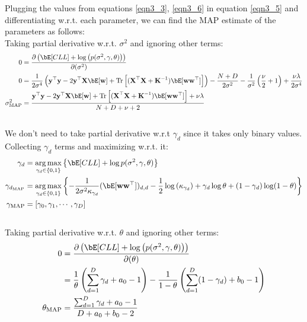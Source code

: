 \documentclass[a4paper,11pt]{article}
\begin{document}
\begin{pmisolution}
\noindent Plugging the values from equations \ref{eqn3_3}, \ref{eqn3_6} in equation \ref{eqn3_5} and differentiating w.r.t. each parameter, we can find the MAP estimate of the parameters as follows:
\\ Taking partial derivative w.r.t. $\sigma^2$ and ignoring other terms:
\begin{align}
    0 &= \frac{\partial \left( \bE[CLL] + \log \left(p(\sigma^2, \gamma, \theta)\right) \right)}{\partial (\sigma^2)} 
    \nonumber
    \\0 &=\frac{1}{2\sigma^4}\left(\textbf{y}^\top\textbf{y} - 2\textbf{y}^\top\textbf{X}\bE[\textbf{w}]+ \text{Tr}\left[(\textbf{X}^\top\textbf{X} +\textbf{K}^{-1})\bE[\textbf{ww}^\top]\right]\right)- \frac{N+D}{2\sigma^2} - \frac{1}{\sigma^2}\left(\frac{\nu}{2} + 1\right) + \frac{\nu\lambda}{2\sigma^4}
    \nonumber
    \\\sigma^2_\text{MAP} &= \frac{\textbf{y}^\top\textbf{y} - 2\textbf{y}^\top\textbf{X}\bE[\textbf{w}]+ \text{Tr}\left[(\textbf{X}^\top\textbf{X} +\textbf{K}^{-1})\bE[\textbf{ww}^\top]\right]  + \nu\lambda}{N+D+\nu+2}
    \nonumber
\end{align}
\\
We don't need to take partial derivative w.r.t $\gamma_d$ since it takes only binary values. Collecting $\gamma_d$ terms and maximizing w.r.t. it:
\begin{align}
    \gamma_d &= \argmax_{\gamma_d \in \{0,1\}}\left\{\bE[CLL] + \log p(\sigma^2, \gamma, \theta) \right\}
    \nonumber
    \\ \gamma_{d_\text{MAP}}&=\argmax_{\gamma_d \in \{0,1\}} \left\{-\frac{1}{2\sigma^2\kappa_{\gamma_d}}(\bE[\textbf{ww}^\top])_{d,d} - \frac{1}{2} \log \left(\kappa_{\gamma_d}\right) + \gamma_d \log \theta + (1 - \gamma_d)\log(1 - \theta)\right\}
    \nonumber
    \\ \mathbf{\gamma}_\text{MAP} &= [\gamma_0, \gamma_1, \cdots, \gamma_D]
    \nonumber
\end{align}
\\
Taking partial derivative w.r.t. $\theta$ and ignoring other terms:
\begin{align}
    0 &= \frac{\partial \left( \bE[CLL] + \log \left(p(\sigma^2, \gamma, \theta)\right) \right)}{\partial (\theta)}
    \nonumber
    \\&= \frac{1}{\theta}\left(\sum_{d=1}^D\gamma_d + a_0 -1\right) - \frac{1}{1-\theta}\left(\sum_{d=1}^D(1- \gamma_d) + b_0 - 1\right)
    \nonumber
    \\ \theta_\text{MAP} &= \frac{\sum_{d=1}^D\gamma_d + a_0 -1}{D + a_0 + b_0 -2}
    \nonumber
\end{align}


\end{pmisolution}
\end{document}
